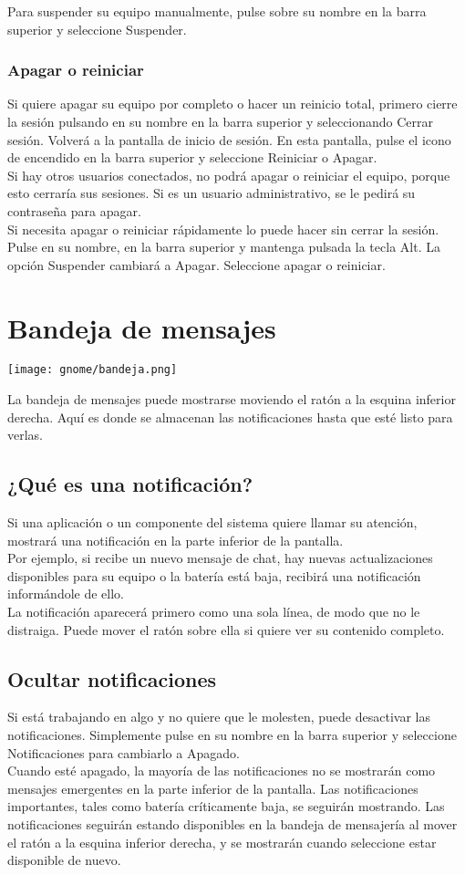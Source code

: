 Para suspender su equipo manualmente, pulse sobre su nombre en la barra superior y seleccione Suspender.
\subsubsection{Apagar o reiniciar}
Si quiere apagar su equipo por completo o hacer un reinicio total, primero cierre la sesión pulsando en su nombre en la barra superior y seleccionando Cerrar sesión. Volverá a la pantalla de inicio de sesión. En esta pantalla, pulse el icono de encendido en la barra superior y seleccione Reiniciar o Apagar.\\
Si hay otros usuarios conectados, no podrá apagar o reiniciar el equipo, porque esto cerraría sus sesiones. Si es un usuario administrativo, se le pedirá su contraseña para apagar.\\

Si necesita apagar o reiniciar rápidamente lo puede hacer sin cerrar la sesión. Pulse en su nombre, en la barra superior y mantenga pulsada la tecla Alt. La opción Suspender cambiará a Apagar. Seleccione apagar o reiniciar.
\section{Bandeja de mensajes}
\begin{center}
\texttt{[image: gnome/bandeja.png]} 
\end{center}
La bandeja de mensajes puede mostrarse moviendo el ratón a la esquina inferior derecha. Aquí es donde se almacenan las notificaciones hasta que esté listo para verlas.
\subsection{¿Qué es una notificación?}
Si una aplicación o un componente del sistema quiere llamar su atención, mostrará una notificación en la parte inferior de la pantalla.\\
Por ejemplo, si recibe un nuevo mensaje de chat, hay nuevas actualizaciones disponibles para su equipo o la batería está baja, recibirá una notificación informándole de ello.\\

La notificación aparecerá primero como una sola línea, de modo que no le distraiga. Puede mover el ratón sobre ella si quiere ver su contenido completo.

\subsection{Ocultar notificaciones}
Si está trabajando en algo y no quiere que le molesten, puede desactivar las notificaciones. Simplemente pulse en su nombre en la barra superior y seleccione Notificaciones para cambiarlo a Apagado.\\
Cuando esté apagado, la mayoría de las notificaciones no se mostrarán como mensajes emergentes en la parte inferior de la pantalla. Las notificaciones importantes, tales como batería críticamente baja, se seguirán mostrando. Las notificaciones seguirán estando disponibles en la bandeja de mensajería al mover el ratón a la esquina inferior derecha, y se mostrarán cuando seleccione estar disponible de nuevo.